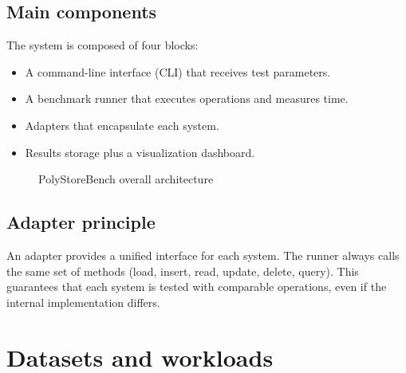 \documentclass[12pt]{report}
\begin{document}
\section{Main components}
The system is composed of four blocks:
\begin{itemize}
  \item A command-line interface (CLI) that receives test parameters.
  \item A benchmark runner that executes operations and measures time.
  \item Adapters that encapsulate each system.
  \item Results storage plus a visualization dashboard.
\end{itemize}

\begin{figure}[H]
\centering
{}
\caption{PolyStoreBench overall architecture}
\end{figure}

\section{Adapter principle}
An adapter provides a unified interface for each system. The runner always calls the same set of
methods (load, insert, read, update, delete, query). This guarantees that each system is tested
with comparable operations, even if the internal implementation differs.

\chapter{Datasets and workloads}
\end{document}
